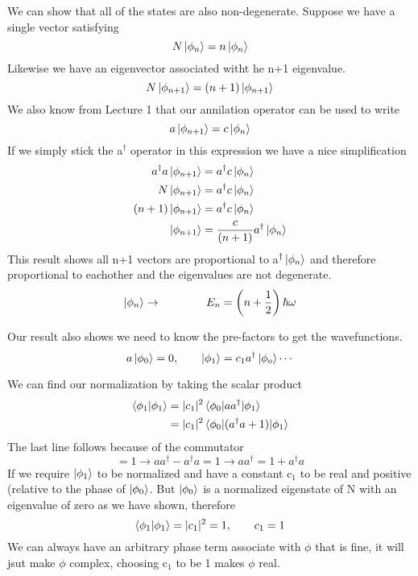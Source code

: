 \documentclass{article}
\newcommand{\be}{\begin{equation}}
\newcommand{\ee}{\end{equation}}
\newcommand{\dg}{\dagger}
\begin{document}
We can show that all of the states are also non-degenerate.
Suppose we have a single vector satisfying 
\be
N\ket{\phi_n} = n\ket{\phi_n}
\ee
Likewise we have an eigenvector associated witht he n+1 eigenvalue.
\be
N\ket{\phi_{n+1}} = (n+1)\ket{\phi_{n+1}}
\ee
We also know from Lecture 1 that our annilation operator can be used to write
\be
a\ket{\phi_{n+1}} = c\ket{\phi_n}
\ee
If we simply stick the a$^\dg$ operator in this expression we have a nice simplification
\be
\begin{split}
    a^\dg a\ket{\phi_{n+1}} &= a^\dg c\ket{\phi_n}\\
    N\ket{\phi_{n+1}} &= a^\dg c\ket{\phi_n}\\
    (n+1)\ket{\phi_{n+1}} &= a^\dg c\ket{\phi_n}\\
    \ket{\phi_{n+1}} &= \frac{c}{(n+1)}a^\dg\ket{\phi_n}\\
\end{split}
\ee
This result shows all n+1 vectors are proportional to a$^\dg \ket{\phi_n}$ and therefore proportional to eachother and the eigenvalues are not degenerate. 
\be
\ket{\phi_n} \rightarrow \qquad \qquad E_n = \left(n + \frac{1}{2}\right)\hbar\omega
\ee

Our result also shows we need to know the pre-factors to get the wavefunctions.
\be
a\ket{\phi_0} = 0, \qquad \ket{\phi_1} = c_1a^\dg\ket{\phi_o} \cdots
\ee

We can find our normalization by taking the scalar product
\be
\begin{split}
    \braket{\phi_1|\phi_1} &= |c_1|^2 \braket{\phi_0|aa^\dg|\phi_1}\\
    &= |c_1|^2 \braket{\phi_0|(a^\dg a+1)|\phi_1}
\end{split}
\ee
The last line follows because of the commutator
\be
[a,a^\dg] = 1 \rightarrow aa^\dg - a^\dg a = 1 \rightarrow  aa^\dg = 1 + a^\dg a
\ee
If we require $\ket{\phi_1}$ to be normalized and have a constant c$_1$ to be real and positive (relative to the phase of $\ket{\phi_0}$.
But $\ket{\phi_0}$ is a normalized eigenstate of N with an eigenvalue of zero as we have shown, therefore
\be
\braket{\phi_1|\phi_1} = |c_1|^2 = 1, \qquad c_1 = 1
\ee
We can always have an arbitrary phase term associate with $\phi$ that is fine, it will jsut make $\phi$ complex, choosing c$_1$ to be 1 makes $\phi$ real. 
\end{document}
